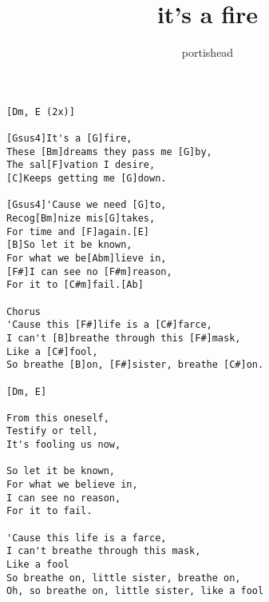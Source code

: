 \author{portishead}
\title{it's a fire}
\maketitle
\begin{verbatim}
[Dm, E (2x)]

[Gsus4]It's a [G]fire,
These [Bm]dreams they pass me [G]by,
The sal[F]vation I desire,
[C]Keeps getting me [G]down.

[Gsus4]'Cause we need [G]to,
Recog[Bm]nize mis[G]takes,
For time and [F]again.[E]
[B]So let it be known,
For what we be[Abm]lieve in,
[F#]I can see no [F#m]reason,
For it to [C#m]fail.[Ab]

Chorus
'Cause this [F#]life is a [C#]farce,
I can't [B]breathe through this [F#]mask,
Like a [C#]fool,
So breathe [B]on, [F#]sister, breathe [C#]on.

[Dm, E]
 
From this oneself,
Testify or tell,
It's fooling us now,

So let it be known,
For what we believe in,
I can see no reason,
For it to fail.

'Cause this life is a farce,
I can't breathe through this mask,
Like a fool
So breathe on, little sister, breathe on,
Oh, so breathe on, little sister, like a fool
\end{verbatim}
